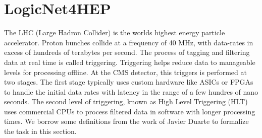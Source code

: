 \chapter{LogicNet4HEP}\label{ch:fpganet4hep}
The LHC (Large Hadron Collider) is the worlds highest energy particle accelerator. Proton bunches collide at a frequency of 40 MHz, with data-rates in excess of hundreds of terabytes per second. The process of tagging and filtering data at real time is called triggering. Triggering helps reduce data to manageable levels for processing offline. At the CMS detector, this triggers is performed at two stages. The first stage typically uses custom hardware like ASICs or FPGAs~\cite{Duarte_2018} to handle the initial data rates with latency in the range of a few hundres of nano seconds. The second level of triggering, known as High Level Triggering (HLT) uses commercial CPUs to process filtered data in software with longer processing times. We borrow some definitions from the work of Javier Duarte\cite{Duarte_2018} to formalize the task in this section.\\


